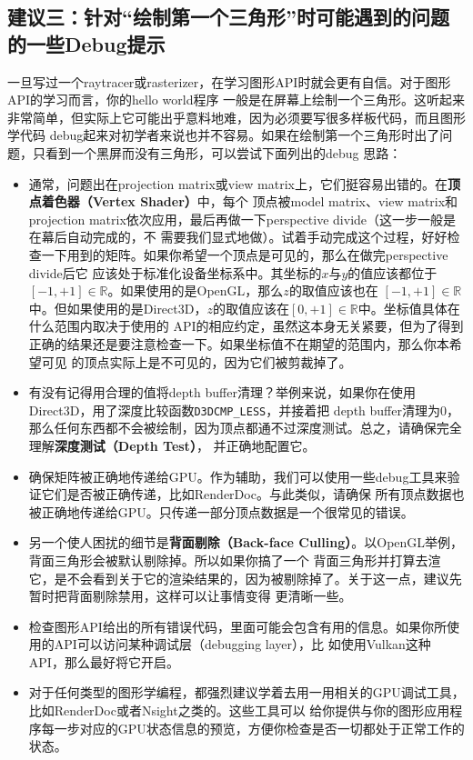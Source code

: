 \documentclass[12pt]{article}
\begin{document}
\subsection*{建议三：针对“绘制第一个三角形”时可能遇到的问题的一些Debug提示}
\indent{}一旦写过一个raytracer或rasterizer，在学习图形API时就会更有自信。对于图形API的学习而言，你的hello world程序
一般是在屏幕上绘制一个三角形。这听起来非常简单，但实际上它可能出乎意料地难，因为必须要写很多样板代码，而且图形学代码
debug起来对初学者来说也并不容易。如果在绘制第一个三角形时出了问题，只看到一个黑屏而没有三角形，可以尝试下面列出的debug
思路：
\begin{itemize}
\item 通常，问题出在projection matrix或view matrix上，它们挺容易出错的。在\textbf{顶点着色器（Vertex Shader）}中，每个
顶点被model matrix、view matrix和projection matrix依次应用，最后再做一下perspective divide（这一步一般是在幕后自动完成的，不
需要我们显式地做）。试着手动完成这个过程，好好检查一下用到的矩阵。如果你希望一个顶点是可见的，那么在做完perspective divide后它
应该处于标准化设备坐标系中。其坐标的$x$与$y$的值应该都位于$[-1,+1]\in \mathbb{R}$。如果使用的是OpenGL，那么$z$的取值应该也在
$[-1,+1]\in\mathbb{R}$中。但如果使用的是Direct3D，$z$的取值应该在$[0,+1]\in \mathbb{R}$中。坐标值具体在什么范围内取决于使用的
API的相应约定，虽然这本身无关紧要，但为了得到正确的结果还是要注意检查一下。如果坐标值不在期望的范围内，那么你本希望可见
的顶点实际上是不可见的，因为它们被剪裁掉了。
\item 有没有记得用合理的值将depth buffer清理？举例来说，如果你在使用Direct3D，用了深度比较函数\texttt{D3DCMP\_LESS}，并接着把
depth buffer清理为0，那么任何东西都不会被绘制，因为顶点都通不过深度测试。总之，请确保完全理解\textbf{深度测试（Depth Test）}，
并正确地配置它。
\item 确保矩阵被正确地传递给GPU。作为辅助，我们可以使用一些debug工具来验证它们是否被正确传递，比如RenderDoc。与此类似，请确保
所有顶点数据也被正确地传递给GPU。只传递一部分顶点数据是一个很常见的错误。
\item 另一个使人困扰的细节是\textbf{背面剔除（Back-face Culling）}。以OpenGL举例，背面三角形会被默认剔除掉。所以如果你搞了一个
背面三角形并打算去渲它，是不会看到关于它的渲染结果的，因为被剔除掉了。关于这一点，建议先暂时把背面剔除禁用，这样可以让事情变得
更清晰一些。
\item 检查图形API给出的所有错误代码，里面可能会包含有用的信息。如果你所使用的API可以访问某种调试层（debugging layer），比
如使用Vulkan这种API，那么最好将它开启。
\item 对于任何类型的图形学编程，都强烈建议学着去用一用相关的GPU调试工具，比如RenderDoc或者Nsight之类的。这些工具可以
给你提供与你的图形应用程序每一步对应的GPU状态信息的预览，方便你检查是否一切都处于正常工作的状态。
\end{itemize}
\end{document}
